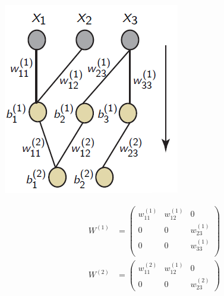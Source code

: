\documentclass[10pt]{beamer} %
\begin{document}
\begin{frame}
   \begin{minipage}[c]{0.4\textwidth}
      \includegraphics[width=\textwidth]{pics/FF_sparse.png}
      \end{minipage}
      \begin{minipage}[c]{0.3\textwidth}
         \begin{align*}
            W^{(1)} &= \begin{pmatrix}
               w_11^{(1)} & w_{12}^{(1)} &0 \\
               0 &0 &w_{23}^{(1)} \\
               0 &0 &w_{33}^{(1)} \\
            \end{pmatrix} \\
            W^{(2)} &= \begin{pmatrix}
               w_11^{(2)} & w_{12}^{(1)} &0 \\
               0 &0 &w_{23}^{(2)}
            \end{pmatrix}
         \end{align*}  
      \end{minipage}
\end{frame}
\end{document}
